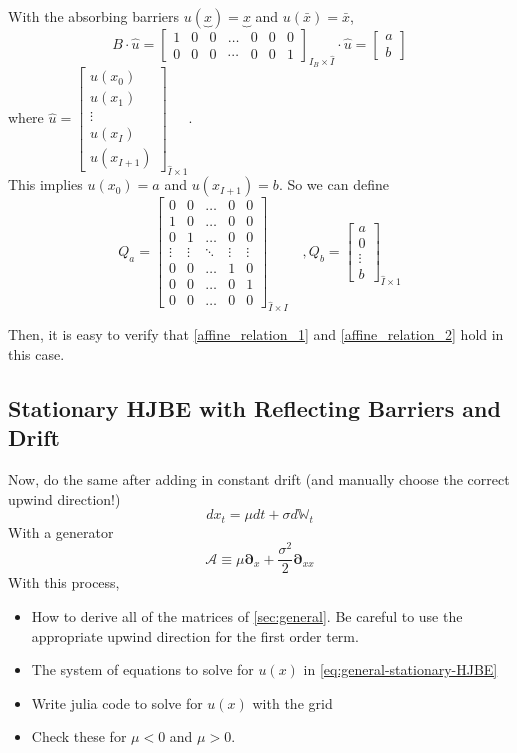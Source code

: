 \documentclass[11pt]{article}
\newcommand{\D}[1][]{\ensuremath{\boldsymbol{\partial}_{#1}}}
\newcommand{\W}{\ensuremath{\mathbb{W}}}
\newcommand{\A}{\ensuremath{\mathcal{A}}}
\begin{document}
With the absorbing barriers $u(\underbrace{x}) = \underbrace{x}$ and $u(\bar{x}) = \bar{x}$,  
\begin{equation}
B\cdot\hat{u} =\begin{bmatrix}
1&0&0&\dots&0&0&0\\
0&0&0&\cdots&0&0&1
\end{bmatrix}_{I_B\times \hat{I}}\cdot\hat{u} = \begin{bmatrix}
a\\
b
\end{bmatrix}
\end{equation}
where $\hat{u} = \begin{bmatrix}
u(x_0)\\
u(x_1)\\
\vdots\\
u(x_I)\\
u(x_{I+1})
\end{bmatrix}_{\hat{I}\times 1}$.\\
This implies $u(x_0) = a$ and $u(x_{I+1}) = b$. So we can define 
\begin{equation}
Q_a = \begin{bmatrix}
0& 0&\dots&0&0\\
1&0&\dots&0&0\\
0&1&\dots&0&0\\
\vdots&\vdots&\ddots&\vdots&\vdots\\
0&0&\dots&1&0\\
0&0&\dots&0&1\\
0&0&\dots&0&0
\end{bmatrix}_{\hat{I}\times I}\quad , Q_b = \begin{bmatrix}
a\\
0\\
\vdots\\
b
\end{bmatrix}_{\hat{I}\times 1}
\end{equation}

Then, it is easy to verify that \eqref{affine_relation_1} and \eqref{affine_relation_2} hold in this case.


\subsection{Stationary HJBE with Reflecting Barriers and Drift}
Now, do the same after adding in constant drift (and manually choose the correct upwind direction!)
$$
d x_t = \mu dt + \sigma d\W_t
$$
With a generator
$$
	\A \equiv \mu \D[x] + \frac{\sigma^2}{2}\D[xx]
$$
With this process,
\begin{itemize}
	\item How to derive all of the matrices of \cref{sec:general}.  Be careful to use the appropriate upwind direction for the first order term.
	\item The system of equations to solve for $u(x)$ in \cref{eq:general-stationary-HJBE}
	\item Write julia code to solve for $u(x)$ with the grid
	\item Check these for $\mu < 0$ and $\mu > 0$.
\end{itemize}
\end{document}
